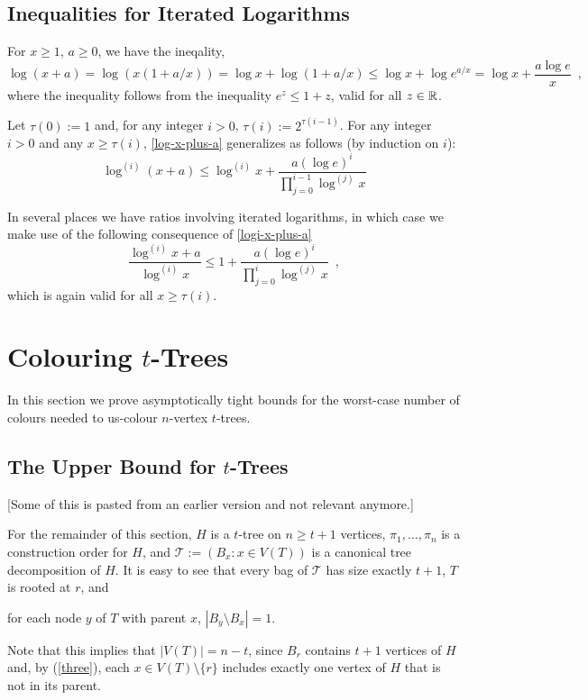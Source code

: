 \documentclass[kpfonts]{patmorin}
\begin{document}
\subsection{Inequalities for Iterated Logarithms}

For $x\ge 1$, $a\ge 0$, we have the ineqality,
\begin{equation}
    \log (x+a) = \log (x(1+a/x)) = \log x + \log(1+a/x) \le \log x + \log e^{a/x} = \log x + \frac{a\log e}{x} \enspace , \label{log-x-plus-a}
\end{equation}
where the inequality follows from the inequality $e^z \le 1+z$, valid for all $z\in\mathbb{R}$.

Let $\tau(0):=1$ and, for any integer $i>0$, $\tau(i):=2^{\tau(i-1)}$. For any integer $i>0$ and any $x\ge \tau(i)$, \cref{log-x-plus-a} generalizes as follows (by induction on $i$):
\begin{equation}
    \log^{(i)}(x+a) \le \log^{(i)} x + \frac{a(\log e)^i}{\prod_{j=0}^{i-1}\log^{(j)} x} \label{logi-x-plus-a}
\end{equation}

In several places we have ratios involving iterated logarithms, in which case we make use of the following consequence of \cref{logi-x-plus-a}
\begin{equation}
    \frac{\log^{(i)} x+a}{\log^{(i)} x} \le 1 + \frac{a(\log e)^i}{\prod_{j=0}^{i}\log^{(j)} x} \enspace, \label{logi-ratio}
\end{equation}
which is again valid for all $x\ge \tau(i)$.

\section{Colouring $t$-Trees}

In this section we prove asymptotically tight bounds for the worst-case number of colours needed to us-colour $n$-vertex $t$-trees.

\subsection{The Upper Bound for $t$-Trees}

[Some of this is pasted from an earlier version and not relevant anymore.]

For the remainder of this section, $H$ is a $t$-tree on $n\ge t+1$ vertices, $\pi_1,\ldots,\pi_n$ is a construction order for $H$, and $\mathcal{T}:=(B_x:x\in V(T))$ is a canonical tree decomposition of $H$.  It is easy to see that every bag of $\mathcal{T}$ has size exactly $t+1$, $T$ is rooted at $r$, and
\begin{inparaenum}[(i)]\setcounter{enumi}{2}
  \item for each node $y$ of $T$ with parent $x$, $|B_y\setminus B_x|=1$.\label{three}
\end{inparaenum}
Note that this implies that $|V(T)|=n-t$, since $B_r$ contains $t+1$ vertices of $H$ and, by (\ref{three}), each $x\in V(T)\setminus\{r\}$ includes exactly one vertex of $H$ that is not in its parent.
\end{document}
